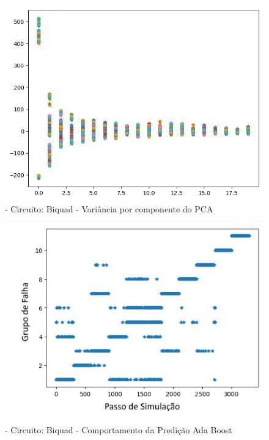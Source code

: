         \begin{figure}[H]
        \begin{center}
        \includegraphics[width=13cm]{./01_Pre_textuais/biquad_figs/dadosPosPCA_Biquad_Highpass_Filter_mc_+_4bitPRBS_[FALHA]raw.png}
        \caption{\label{fig:pcaAPOSSalenkey}- Circuito: Biquad - Variância por componente do PCA}
        \end{center}
        \end{figure}
        
        \begin{figure}[H]
        \begin{center}
        \includegraphics[width=13cm]{./01_Pre_textuais/biquad_figs/AdaBoostClassifier_Biquad_Highpass_Filter_mc_+_4bitPRBS_[FALHA]raw.png}
        \caption{\label{fig:DecisionTreeClassifieSalenkey}- Circuito: Biquad - Comportamento da Predição Ada Boost}
        \end{center}
        \end{figure}
       
